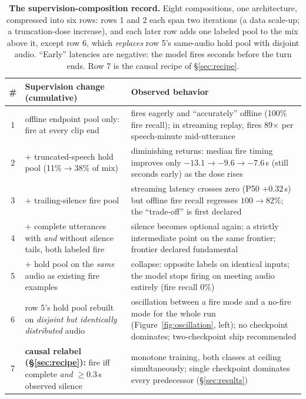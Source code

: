 \documentclass[11pt]{article}
\begin{document}
\begin{table}[t]
  \centering\small
  \caption{\textbf{The supervision-composition record.} Eight compositions, one architecture, compressed into six rows: rows 1 and 2 each span two iterations (a data scale-up; a truncation-dose increase), and each later row adds one labeled pool to the mix above it, except row 6, which \emph{replaces} row 5's same-audio hold pool with disjoint audio. ``Early'' latencies are negative: the model fires seconds before the turn ends. Row 7 is the causal recipe of \S\ref{sec:recipe}.}
  \label{tab:composition}
  \setlength{\tabcolsep}{4pt}
  \begin{tabularx}{\textwidth}{@{}c>{\raggedright\arraybackslash}X>{\raggedright\arraybackslash}X@{}}
    \toprule
    \# & Supervision change (cumulative) & Observed behavior \\
    \midrule
    1 & offline endpoint pool only: fire at every clip end & fires eagerly and ``accurately'' offline (100\% fire recall); in streaming replay, fires 89$\times$ per speech-minute mid-utterance \\
    2 & $+$ truncated-speech hold pool (11\%${\to}$38\% of mix) & diminishing returns: median fire timing improves only $-13.1{\to}-9.6{\to}-7.6$\,s (still seconds early) as the dose rises \\
    3 & $+$ trailing-silence fire pool & streaming latency crosses zero (P50 $+0.32$\,s) but offline fire recall regresses $100{\to}82$\%; the ``trade-off'' is first declared \\
    4 & $+$ complete utterances with \emph{and} without silence tails, both labeled fire & silence becomes optional again; a strictly intermediate point on the same frontier; frontier declared fundamental \\
    5 & $+$ hold pool on the \emph{same} audio as existing fire examples & collapse: opposite labels on identical inputs; the model stops firing on meeting audio entirely (fire recall 0\%) \\
    6 & row 5's hold pool rebuilt on \emph{disjoint but identically distributed} audio & oscillation between a fire mode and a no-fire mode for the whole run (Figure~\ref{fig:oscillation}, left); no checkpoint dominates; two-checkpoint ship recommended \\
    \midrule
    7 & \textbf{causal relabel (\S\ref{sec:recipe}):} fire iff complete \emph{and} ${\ge}0.3$\,s observed silence & monotone training, both classes at ceiling simultaneously; single checkpoint dominates every predecessor (\S\ref{sec:results}) \\
    \bottomrule
  \end{tabularx}
\end{table}
\end{document}
